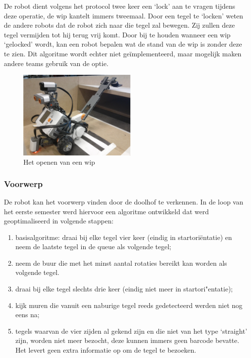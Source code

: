 \documentclass[eind]{penoverslag}
\begin{document}
De robot dient volgens het protocol twee keer een `lock' aan te vragen tijdens deze operatie, de wip kantelt immers tweemaal. 
Door een tegel te `locken' weten de andere robots dat de robot zich naar die tegel zal bewegen. Zij zullen deze tegel vermijden tot hij terug vrij komt. Door bij te houden wanneer een wip `gelocked' wordt, kan een robot bepalen wat de stand van de wip is zonder deze te zien. Dit algoritme wordt echter niet ge\"implementeerd, maar mogelijk maken andere teams gebruik van de optie.

\begin{figure}[hb!]
	\centering
	\includegraphics[width=0.52\textwidth]{robotWip}
	\caption{Het openen van een wip}
	\label{fig:robotWip}
\end{figure}


\subsubsection{Voorwerp} %
\label{sssec:AlgoZoek}
De robot kan het voorwerp vinden door de doolhof te verkennen. In de loop van het eerste semester werd hiervoor een algoritme ontwikkeld dat werd geoptimaliseerd in volgende stappen: 

\begin{enumerate}
\item basisalgoritme: draai bij elke tegel vier keer (eindig in startori\"entatie) en neem de laatste tegel in de queue als volgende tegel;
\item neem de buur die met het minst aantal rotaties bereikt kan worden als volgende tegel.
\item draai bij elke tegel slechts drie keer (eindig niet meer in startori"entatie);
\item kijk muren die vanuit een naburige tegel reeds gedetecteerd werden niet nog eens na;
\item tegels waarvan de vier zijden al gekend zijn en die niet van het type `straight' zijn, worden niet meer bezocht, deze kunnen immers geen barcode bevatte. Het levert geen extra informatie op om de tegel te bezoeken.
\end{enumerate}
\end{document}
